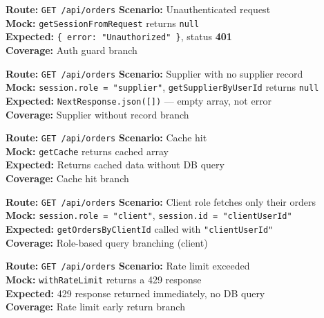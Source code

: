 ﻿\documentclass[12pt,a4paper]{report}
\newcommand{\pone}{\textbf{\color{p1red}P1}}
\newcommand{\ptwo}{\textbf{\color{p2orange}P2}}
\begin{document}
\begin{tcolorbox}[testbox,title={ORD-012 \hfill \pone}]
\textbf{Route:} \texttt{GET /api/orders} \quad \textbf{Scenario:} Unauthenticated request \\
\textbf{Mock:} \texttt{getSessionFromRequest} returns \texttt{null} \\
\textbf{Expected:} \texttt{\{ error: "Unauthorized" \}}, status \textbf{401} \\
\textbf{Coverage:} Auth guard branch
\end{tcolorbox}

\begin{tcolorbox}[testbox,title={ORD-013 \hfill \ptwo}]
\textbf{Route:} \texttt{GET /api/orders} \quad \textbf{Scenario:} Supplier with no supplier record \\
\textbf{Mock:} \texttt{session.role = "supplier"}, \texttt{getSupplierByUserId} returns \texttt{null} \\
\textbf{Expected:} \texttt{NextResponse.json([])} --- empty array, not error \\
\textbf{Coverage:} Supplier without record branch
\end{tcolorbox}

\begin{tcolorbox}[testbox,title={ORD-014 \hfill \ptwo}]
\textbf{Route:} \texttt{GET /api/orders} \quad \textbf{Scenario:} Cache hit \\
\textbf{Mock:} \texttt{getCache} returns cached array \\
\textbf{Expected:} Returns cached data without DB query \\
\textbf{Coverage:} Cache hit branch
\end{tcolorbox}

\begin{tcolorbox}[testbox,title={ORD-015 \hfill \ptwo}]
\textbf{Route:} \texttt{GET /api/orders} \quad \textbf{Scenario:} Client role fetches only their orders \\
\textbf{Mock:} \texttt{session.role = "client"}, \texttt{session.id = "clientUserId"} \\
\textbf{Expected:} \texttt{getOrdersByClientId} called with \texttt{"clientUserId"} \\
\textbf{Coverage:} Role-based query branching (client)
\end{tcolorbox}

\begin{tcolorbox}[testbox,title={ORD-016 \hfill \ptwo}]
\textbf{Route:} \texttt{GET /api/orders} \quad \textbf{Scenario:} Rate limit exceeded \\
\textbf{Mock:} \texttt{withRateLimit} returns a 429 response \\
\textbf{Expected:} 429 response returned immediately, no DB query \\
\textbf{Coverage:} Rate limit early return branch
\end{tcolorbox}
\end{document}
